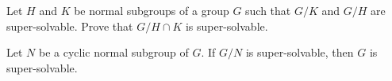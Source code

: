 
\begin{exercise}
\label{xca:super_quotient}
Let $H$ and $K$ be normal subgroups of a group $G$ such that $G/K$ and $G/H$
are super-solvable. Prove that $G/H\cap K$ is super-solvable. 
\end{exercise}


\begin{exercise}
\label{xca:Nciclico}
Let $N$ be a cyclic normal subgroup of $G$. If $G/N$ is super-solvable, then 
$G$ is super-solvable. 
\end{exercise}



